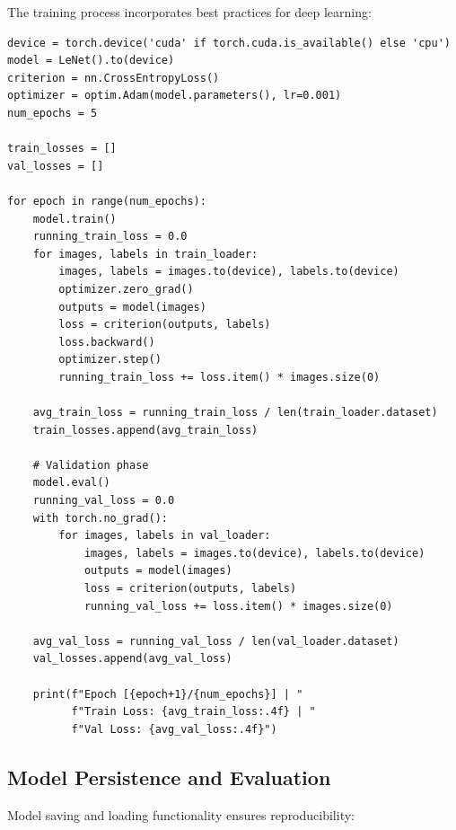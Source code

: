 \documentclass[a4paper, journal]{IEEEtran}
\begin{document}
The training process incorporates best practices for deep learning:

\begin{lstlisting}[caption=Training Loop Implementation]
device = torch.device('cuda' if torch.cuda.is_available() else 'cpu')
model = LeNet().to(device)
criterion = nn.CrossEntropyLoss()
optimizer = optim.Adam(model.parameters(), lr=0.001)
num_epochs = 5

train_losses = []
val_losses = []

for epoch in range(num_epochs):
    model.train()
    running_train_loss = 0.0
    for images, labels in train_loader:
        images, labels = images.to(device), labels.to(device)
        optimizer.zero_grad()
        outputs = model(images)
        loss = criterion(outputs, labels)
        loss.backward()
        optimizer.step()
        running_train_loss += loss.item() * images.size(0)
    
    avg_train_loss = running_train_loss / len(train_loader.dataset)
    train_losses.append(avg_train_loss)
    
    # Validation phase
    model.eval()
    running_val_loss = 0.0
    with torch.no_grad():
        for images, labels in val_loader:
            images, labels = images.to(device), labels.to(device)
            outputs = model(images)
            loss = criterion(outputs, labels)
            running_val_loss += loss.item() * images.size(0)
    
    avg_val_loss = running_val_loss / len(val_loader.dataset)
    val_losses.append(avg_val_loss)
    
    print(f"Epoch [{epoch+1}/{num_epochs}] | "
          f"Train Loss: {avg_train_loss:.4f} | "
          f"Val Loss: {avg_val_loss:.4f}")
\end{lstlisting}

\subsection{Model Persistence and Evaluation}

Model saving and loading functionality ensures reproducibility:
\end{document}
